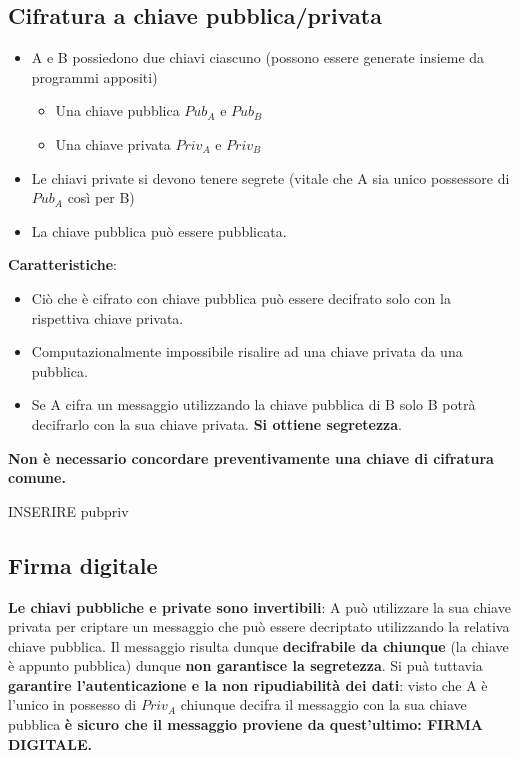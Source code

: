\documentclass[12pt]{article}
\begin{document}
		\subsection{Cifratura a chiave pubblica/privata}
			\begin{itemize}
				\item A e B possiedono due chiavi ciascuno (possono essere generate insieme da programmi appositi)
				\begin{itemize}
					\item Una chiave pubblica $Pub_{A}$ e $Pub_{B}$
					\item Una chiave privata $Priv_{A}$ e $Priv_{B}$
				\end{itemize}
				\item Le chiavi private si devono tenere segrete (vitale che A sia unico possessore di $Pub_{A}$ così per B)
				\item La chiave pubblica può essere pubblicata.
			\end{itemize}
			\textbf{Caratteristiche}:
			\begin{itemize}
				\item Ciò che è cifrato con chiave pubblica può essere decifrato solo con la rispettiva chiave privata.
				\item Computazionalmente impossibile risalire ad una chiave privata da una pubblica.
				\item Se A cifra un messaggio utilizzando la chiave pubblica di B solo B potrà decifrarlo con la sua chiave privata. \textbf{Si ottiene segretezza}.
			\end{itemize}
			\textbf{Non è necessario concordare preventivamente una chiave di cifratura comune.}
		
			INSERIRE pubpriv\\
		
		\subsection{Firma digitale}
			\textbf{Le chiavi pubbliche e private sono invertibili}: A può utilizzare la sua chiave privata per criptare un messaggio che può essere decriptato utilizzando la relativa chiave pubblica. Il messaggio risulta dunque \textbf{decifrabile da chiunque} (la chiave è appunto pubblica) dunque \textbf{non garantisce la segretezza}. Si puà tuttavia \textbf{garantire l'autenticazione e la non ripudiabilità dei dati}: visto che A è l'unico in possesso di $Priv_{A}$ chiunque decifra il messaggio con la sua chiave pubblica \textbf{è sicuro che il messaggio proviene da quest'ultimo: FIRMA DIGITALE.}\\
			\newline
\end{document}
